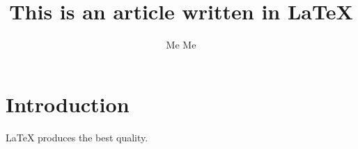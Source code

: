 \documentclass{article}
\title{This is an article written in LaTeX}
\author{Me Me}
\begin{document}
\maketitle

\section{Introduction}

LaTeX produces the best quality.
\end{document}
